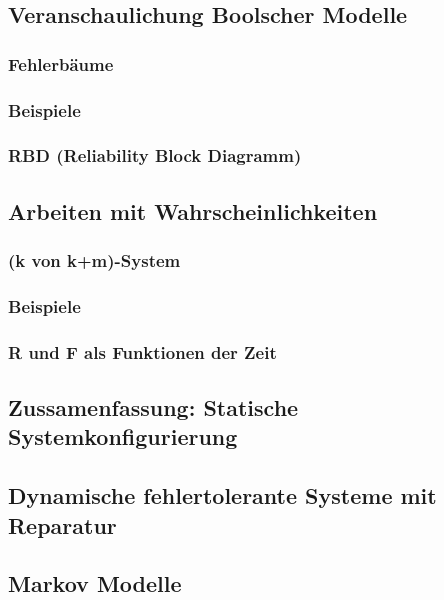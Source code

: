 \subsection{Veranschaulichung Boolscher Modelle}
\subsubsection{Fehlerbäume}
\subsubsection*{Beispiele}
\subsubsection{RBD (Reliability Block Diagramm)}
\subsection{Arbeiten mit Wahrscheinlichkeiten}
\subsubsection{(k von k+m)-System}
\subsubsection*{Beispiele}

\subsubsection{R und F als Funktionen der Zeit}

\subsection{Zussamenfassung: Statische Systemkonfigurierung}

\subsection{Dynamische fehlertolerante Systeme mit Reparatur}
\subsection{Markov Modelle}
